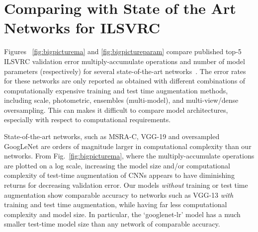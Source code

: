 \documentclass[thesis]{subfiles}
\begin{document}
    \section{Comparing with State of the Art Networks for ILSVRC}
    Figures ~\ref{fig:bigpicturema} and \ref{fig:bigpictureparam} compare published top-5 ILSVRC validation error \vs multiply-accumulate operations and number of model parameters (respectively) for several state-of-the-art networks~\citep{journals/corr/SimonyanZ14a,journals/corr/SzegedyLJSRAEVR14,journals/corr/HeZR015}. The error rates for these networks are only reported as obtained with different combinations of computationally expensive training and test time augmentation methods, including scale, photometric, ensembles (multi-model), and multi-view/dense oversampling. This can makes it difficult to compare model architectures, especially with respect to computational requirements.
    
    State-of-the-art networks, such as MSRA-C, VGG-19 and oversampled GoogLeNet are orders of magnitude larger in computational complexity than our networks. From Fig.~\ref{fig:bigpicturema}, where the multiply-accumulate operations are plotted on a log scale, increasing the model size and/or computational complexity of test-time augmentation of CNNs appears to have diminishing returns for decreasing validation error. Our models \emph{without} training or test time augmentation show comparable accuracy to networks such as VGG-13 \emph{with} training and test time augmentation, while having far less computational complexity and model size. In particular, the `googlenet-lr' model has a much smaller test-time model size than any network of comparable accuracy. 
    
\end{document}
